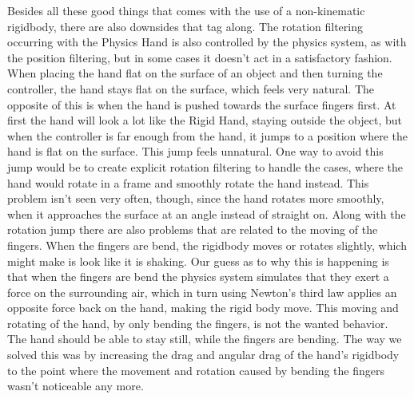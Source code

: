 Besides all these good things that comes with the use of a non-kinematic rigidbody, there are also downsides that tag along. The rotation filtering occurring with the Physics Hand is also controlled by the physics system, as with the position filtering, but in some cases it doesn't act in a satisfactory fashion. When placing the hand flat on the surface of an object and then turning the controller, the hand stays flat on the surface, which feels very natural. The opposite of this is when the hand is pushed towards the surface fingers first. At first the hand will look a lot like the Rigid Hand, staying outside the object, but when the controller is far enough from the hand, it jumps to a position where the hand is flat on the surface. This jump feels unnatural. One way to avoid this jump would be to create explicit rotation filtering to handle the cases, where the hand would rotate in a frame and smoothly rotate the hand instead. This problem isn't seen very often, though, since the hand rotates more smoothly, when it approaches the surface at an angle instead of straight on. Along with the rotation jump there are also problems that are related to the moving of the fingers. When the fingers are bend, the rigidbody moves or rotates slightly, which might make is look like it is shaking. Our guess as to why this is happening is that when the fingers are bend the physics system simulates that they exert a force on the surrounding air, which in turn using Newton's third law applies an opposite force back on the hand, making the rigid body move. This moving and rotating of the hand, by only bending the fingers, is not the wanted behavior. The hand should be able to stay still, while the fingers are bending. The way we solved this was by increasing the drag and angular drag of the hand's rigidbody to the point where the movement and rotation caused by bending the fingers wasn't noticeable any more.

